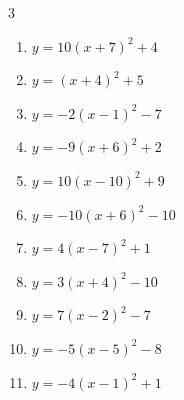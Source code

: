 \begin{multicols}{3}
\begin{enumerate}
  \item $\displaystyle y=10\left( x+7\right)^{2}+4$

        \phantom{$\displaystyle 頂点\left( -7 , 4 \right)$}

  \item $\displaystyle y=\left( x+4\right)^{2}+5$

        \phantom{$\displaystyle 頂点\left( -4 , 5 \right)$}

  \item $\displaystyle y=-2\left( x-1\right)^{2}-7$

        \phantom{$\displaystyle 頂点\left( 1 , -7 \right)$}

  \item $\displaystyle y=-9\left( x+6\right)^{2}+2$

        \phantom{$\displaystyle 頂点\left( -6 , 2 \right)$}

  \item $\displaystyle y=10\left( x-10\right)^{2}+9$

        \phantom{$\displaystyle 頂点\left( 10 , 9 \right)$}

  \item $\displaystyle y=-10\left( x+6\right)^{2}-10$

        \phantom{$\displaystyle 頂点\left( -6 , -10 \right)$}

\columnbreak %

\resetques

  \item $\displaystyle y=4\left( x-7\right)^{2}+1$

        \phantom{$\displaystyle 頂点\left( 7 , 1 \right)$}

  \item $\displaystyle y=3\left( x+4\right)^{2}-10$

        \phantom{$\displaystyle 頂点\left( -4 , -10 \right)$}

  \item $\displaystyle y=7\left( x-2\right)^{2}-7$

        \phantom{$\displaystyle 頂点\left( 2 , -7 \right)$}

  \item $\displaystyle y=-5\left( x-5\right)^{2}-8$

        \phantom{$\displaystyle 頂点\left( 5 , -8 \right)$}

  \item $\displaystyle y=-4\left( x-1\right)^{2}+1$

        \phantom{$\displaystyle 頂点\left( 1 , 1 \right)$}


\end{enumerate}
\end{multicols}
